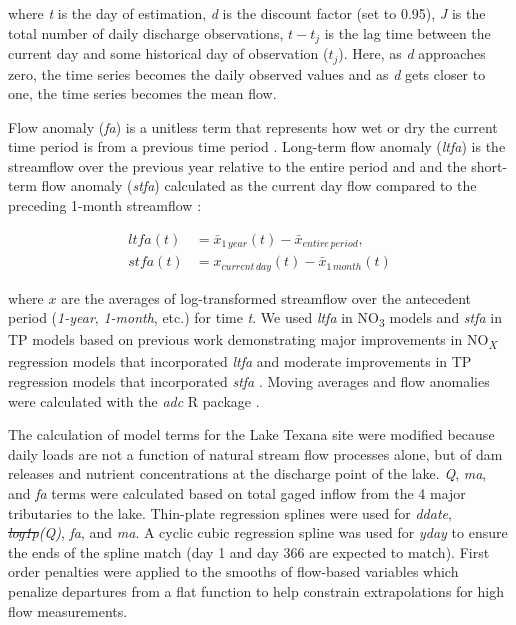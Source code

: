 \documentclass[fleqn,10pt,lineno]{wlpeerj} %
\providecommand{\DIFaddtex}[1]{{\protect\color{blue}\uwave{#1}}} %
\providecommand{\DIFdeltex}[1]{{\protect\color{red}\sout{#1}}}                      %
\providecommand{\DIFaddbegin}{} %
\providecommand{\DIFaddend}{} %
\providecommand{\DIFdelbegin}{} %
\providecommand{\DIFdelend}{} %
\providecommand{\DIFadd}[1]{\texorpdfstring{\DIFaddtex{#1}}{#1}} %
\providecommand{\DIFdel}[1]{\texorpdfstring{\DIFdeltex{#1}}{}} %
\begin{document}
where \emph{t} is the day of estimation, \emph{d} is the discount factor
(set to 0.95), \emph{J} is the total number of daily discharge
observations, \(t-t_j\) is the lag time between the current day and some
historical day of observation (\(t_j\)). Here, as \emph{d} approaches
zero, the time series becomes the daily observed values and as \emph{d}
gets closer to one, the time series becomes the mean flow.

Flow anomaly (\emph{fa}) is a unitless term that represents how wet or
dry the current time period is from a previous time period
\autocite{vecchiaTrendsConcentrationsUse2009,zhang_improving_2017}.
Long-term flow anomaly (\emph{ltfa}) is the streamflow over the previous
year relative to the entire period
\autocite[Eq.~\ref{eq3},][]{zhang_improving_2017} and and the short-term
flow anomaly (\emph{stfa}) calculated as the current day flow compared
to the preceding 1-month streamflow
\autocite[Eq.~\ref{eq4},][]{zhang_improving_2017}:

\begin{align}
ltfa(t) &= \bar{x}_{1\,year}(t) - \bar{x}_{entire\,period}, \label{eq3}\\
stfa(t) &= x_{current\,day}(t) - \bar{x}_{1\,month}(t) \label{eq4}
\end{align}

where \(x\) are the averages of log-transformed streamflow over the
antecedent period (\emph{1-year}, \emph{1-month}, etc.) for time
\emph{t}. We used \emph{ltfa} in NO\textsubscript{3} models and
\emph{stfa} in TP models based on previous work demonstrating major
improvements in NO\textsubscript{\emph{X}} regression models that
incorporated \emph{ltfa} and moderate improvements in TP regression
models that incorporated \emph{stfa} \autocite{zhang_improving_2017}.
Moving averages and flow anomalies were calculated with the \emph{adc} R
package \autocite{schrammAdcCalculateAntecedant2023}.

The calculation of model terms for the Lake Texana site were modified
because daily loads are not a function of natural stream flow processes
alone, but of dam releases and nutrient concentrations at the discharge
point of the lake. \emph{Q}, \emph{ma}, and \emph{fa} terms were
calculated based on total gaged inflow from the 4 major tributaries to
the lake. Thin-plate regression splines were used for \emph{ddate},
\emph{\DIFdelbegin \DIFdel{log1p}\DIFdelend \DIFaddbegin \DIFadd{log}\DIFaddend (\DIFaddbegin \DIFadd{1+}\DIFaddend Q)}, \emph{fa}, and \emph{ma}. A cyclic cubic regression
spline was used for \emph{yday} to ensure the ends of the spline match
(day 1 and day 366 are expected to match). First order penalties were
applied to the smooths of flow-based variables which penalize departures
from a flat function to help constrain extrapolations for high flow
measurements.
\end{document}
